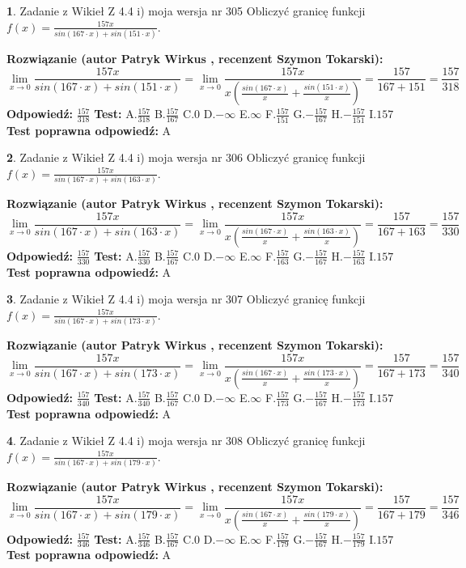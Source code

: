 \documentclass[12pt, a4paper]{article}
\theoremstyle{definition} %
\newtheorem{zad}{}
\newcommand{\zadStart}[1]{\begin{zad}#1\newline}
\newcommand{\zadStop}{\end{zad}}
\newcommand{\rozwStart}[2]{\noindent \textbf{Rozwiązanie (autor #1 , recenzent #2): }\newline}
\newcommand{\rozwStop}{\newline}
\newcommand{\odpStart}{\noindent \textbf{Odpowiedź:}\newline}
\newcommand{\odpStop}{\newline}
\newcommand{\testStart}{\noindent \textbf{Test:}\newline}
\newcommand{\testStop}{\newline}
\newcommand{\kluczStart}{\noindent \textbf{Test poprawna odpowiedź:}\newline}
\newcommand{\kluczStop}{\newline}
\begin{document}
\zadStart{Zadanie z Wikieł Z 4.4 i) moja wersja nr 305}
Obliczyć granicę funkcji $f(x)=\frac{157x}{sin(167\cdot x) +sin(151\cdot x)}$.
\zadStop
\rozwStart{Patryk Wirkus}{Szymon Tokarski}
$$\lim\limits_{x\to 0}\frac{157x}{sin(167\cdot x) +sin(151\cdot x)}=\lim\limits_{x\to 0}\frac{157x}{x(\frac{sin(167\cdot x)}{x}+\frac{sin(151\cdot x)}{x})}=\frac{157}{167+151} = \frac{157}{318}$$
\rozwStop
\odpStart
$\frac{157}{318}$
\odpStop
\testStart
A.$\frac{157}{318}$
B.$\frac{157}{167}$
C.$0$
D.$-\infty$
E.$\infty$
F.$\frac{157}{151}$
G.$-\frac{157}{167}$
H.$-\frac{157}{151}$
I.$157$
\testStop
\kluczStart
A
\kluczStop



\zadStart{Zadanie z Wikieł Z 4.4 i) moja wersja nr 306}
Obliczyć granicę funkcji $f(x)=\frac{157x}{sin(167\cdot x) +sin(163\cdot x)}$.
\zadStop
\rozwStart{Patryk Wirkus}{Szymon Tokarski}
$$\lim\limits_{x\to 0}\frac{157x}{sin(167\cdot x) +sin(163\cdot x)}=\lim\limits_{x\to 0}\frac{157x}{x(\frac{sin(167\cdot x)}{x}+\frac{sin(163\cdot x)}{x})}=\frac{157}{167+163} = \frac{157}{330}$$
\rozwStop
\odpStart
$\frac{157}{330}$
\odpStop
\testStart
A.$\frac{157}{330}$
B.$\frac{157}{167}$
C.$0$
D.$-\infty$
E.$\infty$
F.$\frac{157}{163}$
G.$-\frac{157}{167}$
H.$-\frac{157}{163}$
I.$157$
\testStop
\kluczStart
A
\kluczStop



\zadStart{Zadanie z Wikieł Z 4.4 i) moja wersja nr 307}
Obliczyć granicę funkcji $f(x)=\frac{157x}{sin(167\cdot x) +sin(173\cdot x)}$.
\zadStop
\rozwStart{Patryk Wirkus}{Szymon Tokarski}
$$\lim\limits_{x\to 0}\frac{157x}{sin(167\cdot x) +sin(173\cdot x)}=\lim\limits_{x\to 0}\frac{157x}{x(\frac{sin(167\cdot x)}{x}+\frac{sin(173\cdot x)}{x})}=\frac{157}{167+173} = \frac{157}{340}$$
\rozwStop
\odpStart
$\frac{157}{340}$
\odpStop
\testStart
A.$\frac{157}{340}$
B.$\frac{157}{167}$
C.$0$
D.$-\infty$
E.$\infty$
F.$\frac{157}{173}$
G.$-\frac{157}{167}$
H.$-\frac{157}{173}$
I.$157$
\testStop
\kluczStart
A
\kluczStop



\zadStart{Zadanie z Wikieł Z 4.4 i) moja wersja nr 308}
Obliczyć granicę funkcji $f(x)=\frac{157x}{sin(167\cdot x) +sin(179\cdot x)}$.
\zadStop
\rozwStart{Patryk Wirkus}{Szymon Tokarski}
$$\lim\limits_{x\to 0}\frac{157x}{sin(167\cdot x) +sin(179\cdot x)}=\lim\limits_{x\to 0}\frac{157x}{x(\frac{sin(167\cdot x)}{x}+\frac{sin(179\cdot x)}{x})}=\frac{157}{167+179} = \frac{157}{346}$$
\rozwStop
\odpStart
$\frac{157}{346}$
\odpStop
\testStart
A.$\frac{157}{346}$
B.$\frac{157}{167}$
C.$0$
D.$-\infty$
E.$\infty$
F.$\frac{157}{179}$
G.$-\frac{157}{167}$
H.$-\frac{157}{179}$
I.$157$
\testStop
\kluczStart
A
\kluczStop
\end{document}
